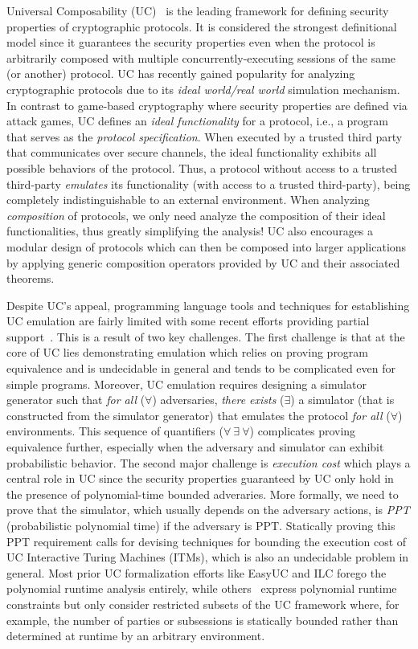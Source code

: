 Universal Composability (UC)~\cite{canettiUC} is the leading framework for defining security properties of cryptographic protocols.
It is considered the strongest definitional model since it guarantees the security properties even when the protocol is arbitrarily composed with
multiple concurrently-executing sessions of the same (or another) protocol.
UC has recently gained popularity for analyzing cryptographic protocols due to its \emph{ideal world/real world} simulation mechanism.
In contrast to game-based cryptography where security properties are defined via attack games,
UC defines an \emph{ideal functionality} for a protocol, i.e., a program that serves as the \emph{protocol specification}.
When executed by a trusted third party that communicates over secure channels, the ideal functionality exhibits all possible behaviors of the protocol.
Thus, a protocol without access to a trusted third-party \emph{emulates} its functionality (with access to a trusted third-party),
being completely indistinguishable to an external environment.
When analyzing \emph{composition} of protocols, we only need analyze the composition of their ideal functionalities, thus greatly
simplifying the analysis!
UC also encourages a modular design of protocols which can then be composed into larger applications by applying generic composition operators
provided by UC and their associated theorems.

Despite UC's appeal, programming language tools and techniques for establishing UC emulation are fairly limited with some recent efforts providing
partial support~\cite{ilc,easyuc,ipdl,symbolicuc,barbosa}. This is a result of two key challenges.
The first challenge is that at the core of UC lies demonstrating emulation which relies on proving program equivalence and is undecidable in general
and tends to be complicated even for simple programs.
Moreover, UC emulation requires designing a simulator generator such that \emph{for all} ($\forall$) adversaries, \emph{there exists} ($\exists$) a simulator (that is constructed
from the simulator generator) that emulates the protocol \emph{for all} ($\forall$) environments.
This sequence of quantifiers ($\forall \ \exists \ \forall$) complicates proving equivalence further, especially when the adversary and simulator can exhibit
probabilistic behavior.
The second major challenge is \emph{execution cost} which plays a central role in UC since the security properties
guaranteed by UC only hold in the presence of polynomial-time bounded adveraries.
More formally, we need to prove that the simulator, which usually depends on the adversary actions, is \emph{PPT} (probabilistic polynomial time)
if the adversary is PPT.
Statically proving this PPT requirement calls for devising techniques for bounding the execution cost of UC Interactive Turing Machines (ITMs),
which is also an undecidable problem in general.
Most prior UC formalization efforts like EasyUC and ILC forego the polynomial runtime analysis entirely, while others~\cite{ipdl,barbosa,ilc}
express polynomial runtime constraints but only consider restricted subsets of the UC framework where, for example, the number of parties
or subsessions is statically bounded rather than determined at runtime by an arbitrary environment.

